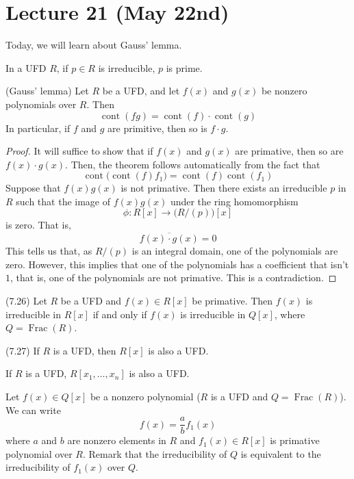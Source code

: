 \section{Lecture 21 (May 22nd)}
Today, we will learn about Gauss' lemma.
\newline
\begin{rmk}
In a UFD $R$, if $p\in R$ is irreducible, $p$ is prime.
\end{rmk}
\vspace{2ex}
\begin{thm}
(Gauss' lemma) Let $R$ be a UFD, and let $f(x)$ and $g(x)$ be nonzero polynomials over $R$. Then
\[\mathop{\mathrm{cont}}(f g)=\mathop{\mathrm{cont}}(f)\cdot \mathop{\mathrm{cont}}(g)\]
In particular, if $f$ and $g$ are primitive, then so is $f\cdot g$.
\end{thm}
\vspace{2ex}
\begin{proof}
It will suffice to show that if $f(x)$ and $g(x)$ are primative, then so are $f(x)\cdot g(x)$. Then, the theorem follows automatically from the fact that 
\[\mathop{\mathrm{cont}}\Big(\mathop{\mathrm{cont}}(f)f_1\Big)=\mathop{\mathrm{cont}}(f)\mathop{\mathrm{cont}}(f_1)\]
Suppose that $f(x)g(x)$ is not primative. Then there exists an irreducible $p$ in $R$ such that the image of $f(x)g(x)$ under the ring homomorphism 
\[\phi :R[x]\rightarrow \Big(R/(p)\Big)[x]\]
is zero. That is,
\[\overline{f(x)\cdot {g}(x)}=0\]
This tells us that, as $R/(p)$ is an integral domain, one of the polynomials are zero. However, this implies that one of the polynomials has a coefficient that isn't $1$, that is, one of the polynomials are not primative. This is a contradiction.
\end{proof}
\vspace{2ex}
\begin{cor}
(7.26) Let $R$ be a UFD and $f(x)\in R[x]$ be primative. Then $f(x)$ is irreducible in $R[x]$ if and only if $f(x)$ is irreducible in $Q[x]$, where $Q=\mathop{\mathrm{Frac}}(R)$. 
\end{cor}
\vspace{2ex}
\begin{cor}
(7.27) If $R$ is a UFD, then $R[x]$ is also a UFD. 
\end{cor}
\vspace{2ex}
\begin{rmk}
If $R$ is a UFD, $R[x_1,\ldots ,x_{n}]$ is also a UFD.
\end{rmk}
\vspace{2ex}
\begin{rmk}
Let $f(x)\in Q[x]$ be a nonzero polynomial ($R$ is a UFD and $Q=\mathop{\mathrm{Frac}}(R)$). We can write 
\[f(x)=\dfrac{a}{b}f_1(x)\]
where $a$ and $b$ are nonzero elements in $R$ and $f_1(x)\in R[x]$ is primative polynomial over $R$. Remark that the irreducibility of $Q$ is equivalent to the irreducibility of $f_1(x)$ over $Q$. 
\end{rmk}
\vspace{2ex}

